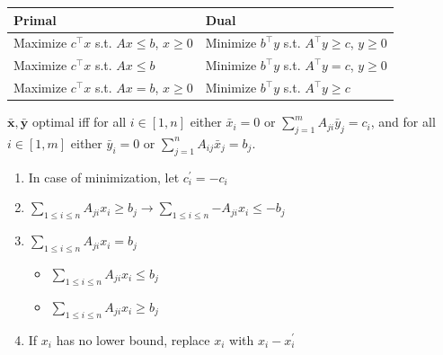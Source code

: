 \begin{tabular}{|l|l|}
\hline
\textbf{Primal} & \textbf{Dual} \\
\hline
Maximize $c^\intercal x$ s.t. $Ax \leq b$, $x \geq 0$ & Minimize $b^\intercal y$ s.t. $A^\intercal y \geq c$, $y \geq 0$ \\
\hline
Maximize $c^\intercal x$ s.t. $Ax \leq b$ & Minimize $b^\intercal y$ s.t. $A^\intercal y = c$, $y \geq 0$ \\
\hline
Maximize $c^\intercal x$ s.t. $Ax = b$, $x \geq 0$ & Minimize $b^\intercal y$ s.t. $A^\intercal y \geq c$ \\
\hline
\end{tabular}
$\bar{\mathbf{x}}, \bar{\mathbf{y}}$ optimal iff for all $i \in [1, n]$ either $\bar{x}_i = 0$ or $\sum_{j=1}^{m}A_{ji}\bar{y}_j = c_i$, and for all $i \in [1, m]$ either $\bar{y}_i = 0$ or $\sum_{j=1}^{n}A_{ij}\bar{x}_j = b_j$.
\begin{enumerate}\itemsep-0.3em
    \item In case of minimization, let $c^\prime_i = -c_i$
    \item $\sum_{1 \leq i \leq n}{A_{ji}x_i} \geq b_j \rightarrow \sum_{1 \leq i \leq n}{-A_{ji}x_i} \leq -b_j$
    \item $\sum_{1 \leq i \leq n}{A_{ji}x_i} = b_j$ 
        \begin{itemize}
            \item $\sum_{1 \leq i \leq n}{A_{ji}x_i} \leq b_j$
            \item $\sum_{1 \leq i \leq n}{A_{ji}x_i} \geq b_j$
        \end{itemize}
    \item If $x_i$ has no lower bound, replace $x_i$ with $x_i - x_i^\prime$
\end{enumerate}
